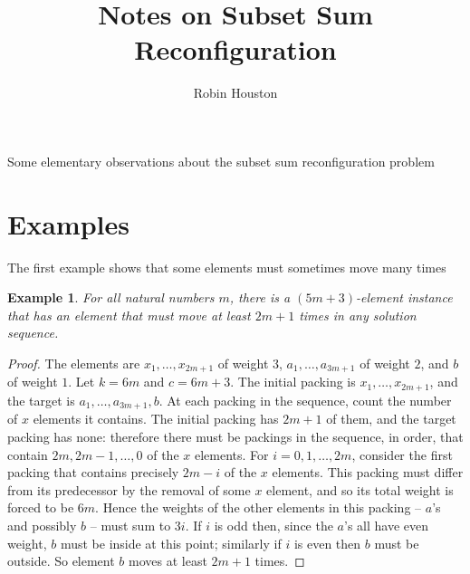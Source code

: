 \documentclass{robinminion}
\author{Robin Houston}
\title{Notes on Subset Sum Reconfiguration}
\newtheorem{eg}[prop]{Example}
\begin{document}
\maketitle
\linespread{1.1}\selectfont

\noindent Some elementary observations about the subset sum reconfiguration problem

\section*{Examples}

\noindent The first example shows that some elements must sometimes move many times
\begin{eg}\label{eg:element-moves-a-lot}
    For all natural numbers $m$, there is a $(5m+3)$-element instance that has an element that must move at least $2m+1$ times in any solution sequence.
\end{eg}
\begin{proof}
    The elements are
    $x_1, \dots, x_{2m+1}$ of weight $3$,
    $a_1, \dots, a_{3m+1}$ of weight $2$,
    and $b$ of weight $1$.
    Let $k=6m$ and $c=6m+3$.
    The initial packing is $x_1, \dots, x_{2m+1}$,
    and the target is $a_1, \dots, a_{3m+1}, b$.
    At each packing in the sequence, count the number of $x$ elements it contains. The initial packing has $2m+1$ of them, and the target packing has none: therefore there must be packings in the sequence, in order, that contain $2m, 2m-1, \dots, 0$ of the $x$ elements. For $i=0, 1, \dots, 2m$, consider the first packing that contains precisely $2m-i$ of the $x$ elements. This packing must differ from its predecessor by the removal of some $x$ element, and so its total weight is forced to be $6m$. Hence the weights of the other elements in this packing -- $a$'s and possibly $b$ -- must sum to $3i$. If $i$ is odd then, since the $a$'s all have even weight, $b$ must be inside at this point; similarly if $i$ is even then $b$ must be outside. So element $b$ moves at least $2m+1$ times.
\end{proof}
\end{document}
